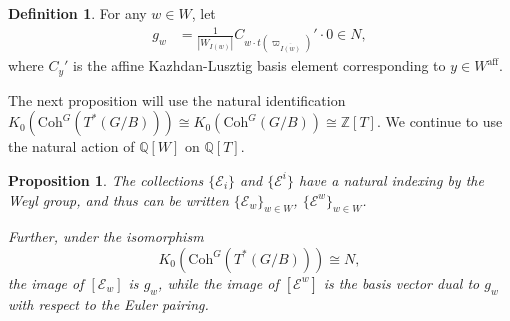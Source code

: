 \documentclass{amsart}
\newtheorem{prop}[thm]{Proposition}
\theoremstyle{definition}
\newtheorem{defn}[thm]{Definition}
\begin{document}
\begin{defn}
    For any $w \in W$, let 
    \begin{align}
        g_w & = \frac{1}{|W_{I(w)}|}C_{w \cdot t(\varpi_{\overline{I(w)}})}' \cdot 0 \in N,
    \end{align}
    where $C_{y}'$ is the affine Kazhdan-Lusztig basis element corresponding to $y \in W^{\mathrm{aff}}$.
\end{defn}

The next proposition will use the natural identification $K_0(\mathrm{Coh}^G(T^*(G/B))) \cong K_0(\mathrm{Coh}^G(G/B)) \cong \mathbb{Z}[T]$. We continue to use the natural action of $\mathbb{Q}[W]$ on $\mathbb{Q}[T]$.
\begin{prop}\label{prop:ewkl}
    The collections $\{\mathcal{E}_i\}$ and $\{\mathcal{E}^i\}$ have a natural indexing by the Weyl group, and thus can be written $\{\mathcal{E}_w\}_{w \in W}$, $\{\mathcal{E}^w\}_{w \in W}$. 
    
    Further, under the isomorphism
    \[
    K_0(\mathrm{Coh}^G(T^*(G/B))) \cong N,
    \]
    the image of $[\mathcal{E}_w]$ is $g_w$, while the image of $[\mathcal{E}^w]$ is the basis vector dual to $g_w$ with respect to the Euler pairing.
\end{prop}
\end{document}
